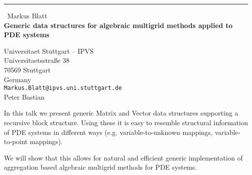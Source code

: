\documentclass{report}
\begin{document}
\begin{center}
\rule{6in}{1pt} \
{\large Markus Blatt \\
{\bf Generic data structures for algebraic multigrid methods applied to PDE systems}}

Universitaet Stuttgart – IPVS \\ Universitaetsstraße 38 \\ 70569 Stuttgart \\ Germany
\\
{\tt Markus.Blatt@ipvs.uni.stuttgart.de}\\
Peter Bastian\end{center}

In this talk we present generic Matrix and Vector data structures
supporting a recursive block structure. Using these it is easy to
resemble structural information of PDE systems in different ways
(e.g. variable-to-unknown mappings, variable-to-point mappings).

We will show that this allows for natural and efficient generic
implementation of aggregation based algebraic multigrid methods for PDE
systems.
\end{document}
